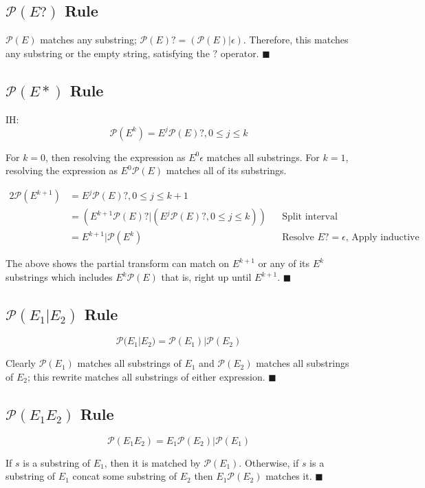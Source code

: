 \documentclass{article}
\newcommand{\ssre}{\mathcal{P}}
\begin{document}
\subsection*{$\ssre(E?)$ Rule}

$\ssre(E)$ matches any substring; $\ssre(E)? = (\ssre(E)|\epsilon)$.
Therefore, this matches any substring or the empty string, satisfying the $?$ operator. 
$\blacksquare$

\subsection*{$\ssre(E*)$ Rule}

IH:
\begin{equation*}
    \ssre(E^k) = E^j\ssre(E)?, 0\leq j \leq k
\end{equation*}

For $k=0$, then resolving the expression as $E^0\epsilon$ matches all substrings.
For $k=1$, resolving the expression as $E^0\ssre(E)$ matches all of its substrings.

\begin{alignat*}{2}
    \ssre(E^{k+1}) &= E^j\ssre(E)?, 0\leq j \leq k+1\\
    &= (E^{k+1}\ssre(E)? | (E^j\ssre(E)?, 0\leq j \leq k)) && \text{Split interval}\\
    &= E^{k+1} | \ssre(E^k) && \text{Resolve $E?=\epsilon$, Apply inductive hypothesis}
\end{alignat*}

The above shows the partial transform can match on $E^{k+1}$ or any of its $E^k$ substrings
which includes $E^k\ssre(E)$ \textemdash{} that is, right up until $E^{k+1}$. 
$\blacksquare$

\subsection*{$\ssre(E_1|E_2)$ Rule}

\begin{equation*}
\ssre(E_1|E_2) = \ssre(E_1)|\ssre(E_2)
\end{equation*}

Clearly $\ssre(E_1)$ matches all substrings of $E_1$ and $\ssre(E_2)$ matches
all substrings of $E_2$; this rewrite matches all substrings of either expression. 
$\blacksquare$

\subsection*{$\ssre(E_{1}E_{2})$ Rule}

\begin{equation*}
    \ssre(E_{1}E_{2}) = E_1 \ssre(E_2) | \ssre(E_1)
\end{equation*}

If $s$ is a substring of $E_1$, then it is matched by $\ssre(E_1)$. Otherwise, if $s$
is a substring of $E_1$ concat some substring of $E_2$ then $E_1 \ssre(E_2)$ matches it.
$\blacksquare$
\end{document}
